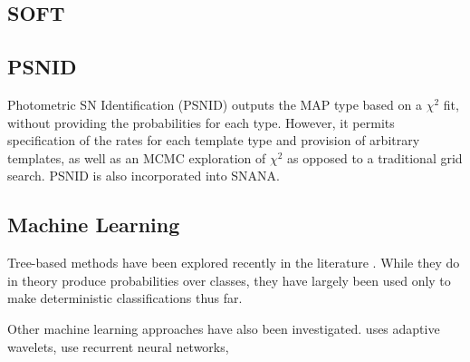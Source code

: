 \documentclass[12pt, onecolumn]{emulateapj}
\begin{document}
\subsection{SOFT}

\citep{Rodney09, Rodney10}

\subsection{PSNID}

Photometric SN Identification (PSNID) \citep{Sako11} outputs the MAP type based on a $\chi^{2}$ fit, without providing the probabilities for each type.  However, it permits specification of the rates for each template type and provision of arbitrary templates, as well as an MCMC exploration of $\chi^{2}$ as opposed to a traditional grid search.  PSNID is also incorporated into SNANA.

\subsection{Machine Learning}

Tree-based methods have been explored recently in the literature \citep{Richards11, Lochner16, Moller16}.  While they do in theory produce probabilities over classes, they have largely been used only to make deterministic classifications thus far.  

Other machine learning approaches have also been investigated.  \citet{Varughese15} uses adaptive wavelets, \citet{Karpenka12, Charnock16} use recurrent neural networks, 




\end{document}

